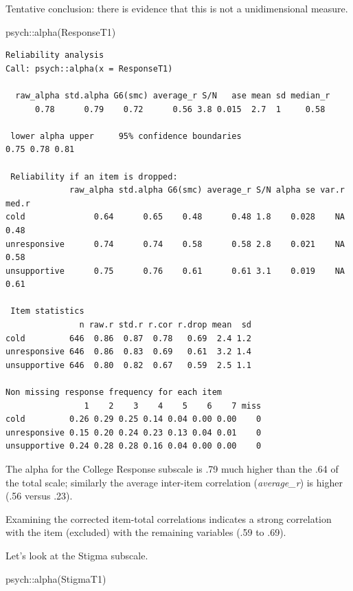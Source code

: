 \documentclass[
  english,
]{book}
\newenvironment{Shaded}{\begin{snugshade}}{\end{snugshade}}
\newcommand{\FunctionTok}[1]{\textcolor[rgb]{0.00,0.00,0.00}{#1}}
\newcommand{\NormalTok}[1]{#1}
\newcommand{\SpecialCharTok}[1]{\textcolor[rgb]{0.00,0.00,0.00}{#1}}
\begin{document}
Tentative conclusion: there is evidence that this is not a unidimensional measure.

\begin{Shaded}
\begin{Highlighting}[]
\NormalTok{psych}\SpecialCharTok{::}\FunctionTok{alpha}\NormalTok{(ResponseT1)}
\end{Highlighting}
\end{Shaded}

\begin{verbatim}
Reliability analysis   
Call: psych::alpha(x = ResponseT1)

  raw_alpha std.alpha G6(smc) average_r S/N   ase mean sd median_r
      0.78      0.79    0.72      0.56 3.8 0.015  2.7  1     0.58

 lower alpha upper     95% confidence boundaries
0.75 0.78 0.81 

 Reliability if an item is dropped:
             raw_alpha std.alpha G6(smc) average_r S/N alpha se var.r med.r
cold              0.64      0.65    0.48      0.48 1.8    0.028    NA  0.48
unresponsive      0.74      0.74    0.58      0.58 2.8    0.021    NA  0.58
unsupportive      0.75      0.76    0.61      0.61 3.1    0.019    NA  0.61

 Item statistics 
               n raw.r std.r r.cor r.drop mean  sd
cold         646  0.86  0.87  0.78   0.69  2.4 1.2
unresponsive 646  0.86  0.83  0.69   0.61  3.2 1.4
unsupportive 646  0.80  0.82  0.67   0.59  2.5 1.1

Non missing response frequency for each item
                1    2    3    4    5    6    7 miss
cold         0.26 0.29 0.25 0.14 0.04 0.00 0.00    0
unresponsive 0.15 0.20 0.24 0.23 0.13 0.04 0.01    0
unsupportive 0.24 0.28 0.28 0.16 0.04 0.00 0.00    0
\end{verbatim}

The alpha for the College Response subscale is .79 much higher than the .64 of the total scale; similarly the average inter-item correlation (\emph{average\_r}) is higher (.56 versus .23).

Examining the corrected item-total correlations indicates a strong correlation with the item (excluded) with the remaining variables (.59 to .69).

Let's look at the Stigma subscale.

\begin{Shaded}
\begin{Highlighting}[]
\NormalTok{psych}\SpecialCharTok{::}\FunctionTok{alpha}\NormalTok{(StigmaT1)}
\end{Highlighting}
\end{Shaded}
\end{document}
